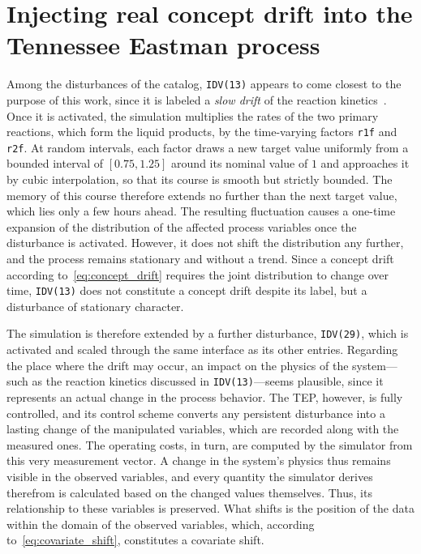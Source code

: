 \section{Injecting real concept drift into the Tennessee Eastman process} \label{sec:drift_injection}
%
Among the disturbances of the catalog, \texttt{IDV(13)} appears to come closest to the purpose of this work, since it is labeled a \emph{slow drift} of the reaction kinetics~\cite{downs.1993}. Once it is activated, the simulation multiplies the rates of the two primary reactions, which form the liquid products, by the time-varying factors \texttt{r1f} and \texttt{r2f}. At random intervals, each factor draws a new target value uniformly from a bounded interval of $[0.75, 1.25]$ around its nominal value of $1$ and approaches it by cubic interpolation, so that its course is smooth but strictly bounded. The memory of this course therefore extends no further than the next target value, which lies only a few hours ahead. The resulting fluctuation causes a one-time expansion of the distribution of the affected process variables once the disturbance is activated. However, it does not shift the distribution any further, and the process remains stationary and without a trend. Since a concept drift according to~\eqref{eq:concept_drift} requires the joint distribution to change over time, \texttt{IDV(13)} does not constitute a concept drift despite its label, but a disturbance of stationary character. \par
%
The simulation is therefore extended by a further disturbance, \texttt{IDV(29)}, which is activated and scaled through the same interface as its other entries. Regarding the place where the drift may occur, an impact on the physics of the system—such as the reaction kinetics discussed in \texttt{IDV(13)}—seems plausible, since it represents an actual change in the process behavior. The TEP, however, is fully controlled, and its control scheme converts any persistent disturbance into a lasting change of the manipulated variables, which are recorded along with the measured ones. The operating costs, in turn, are computed by the simulator from this very measurement vector. A change in the system’s physics thus remains visible in the observed variables, and every quantity the simulator derives therefrom is calculated based on the changed values themselves. Thus, its relationship to these variables is preserved. What shifts is the position of the data within the domain of the observed variables, which, according to~\eqref{eq:covariate_shift}, constitutes a covariate shift. \par
